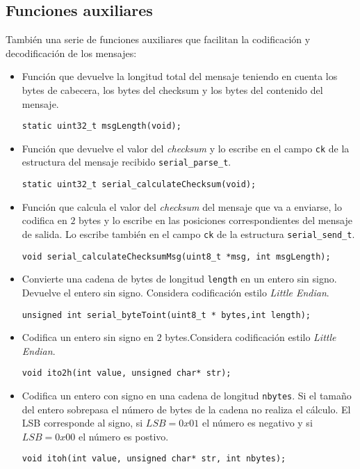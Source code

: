 \subsection{Funciones auxiliares}
También una serie de funciones auxiliares que facilitan la codificación y decodificación de los mensajes:
\begin{itemize}
	\item Función que devuelve la longitud total del mensaje teniendo en cuenta los bytes de cabecera, los bytes del checksum y los bytes del contenido del mensaje.
	\begin{lstlisting}[style=C]
	static uint32_t msgLength(void);
	\end{lstlisting}
	\item Función que devuelve el valor del \textit{checksum} y lo escribe en el campo \texttt{ck} de la estructura del mensaje recibido \texttt{serial\_parse\_t}.
	\begin{lstlisting}[style=C]
	static uint32_t serial_calculateChecksum(void);
	\end{lstlisting}
	\item Función que calcula el valor del \textit{checksum} del mensaje que va a enviarse, lo codifica en $2$ bytes y lo escribe en las posiciones correspondientes del mensaje de salida. Lo escribe también en el campo \texttt{ck} de la estructura \texttt{serial\_send\_t}.
	\begin{lstlisting}[style=C]
	void serial_calculateChecksumMsg(uint8_t *msg, int msgLength);
	\end{lstlisting}
	\item Convierte una cadena de bytes de longitud \texttt{length} en un entero sin signo. Devuelve el entero sin signo. Considera codificación estilo \textit{Little Endian}.
	\begin{lstlisting}[style=C]
	unsigned int serial_byteToint(uint8_t * bytes,int length);
	\end{lstlisting}
	\item Codifica un entero sin signo en $2$ bytes.Considera codificación estilo \textit{Little Endian}.
	\begin{lstlisting}[style=C]
	void ito2h(int value, unsigned char* str); 
	\end{lstlisting}
	\item Codifica un entero con signo en una cadena de longitud \texttt{nbytes}. Si el tamaño del entero sobrepasa el número de bytes de la cadena no realiza el cálculo. El LSB corresponde al signo, si $LSB=0x01$ el número es negativo y si $LSB=0x00$ el número es postivo.
	\begin{lstlisting}[style=C]
	void itoh(int value, unsigned char* str, int nbytes);
	\end{lstlisting}
\end{itemize}

